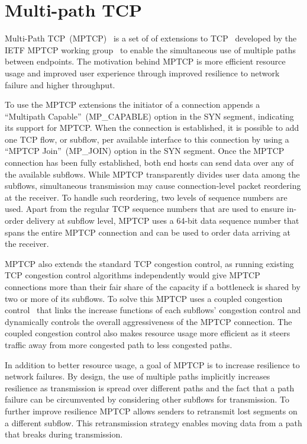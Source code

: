 \section{Multi-path TCP}
\label{sec:transports}
Multi-Path TCP~(MPTCP)~\cite{BPB11,RFC6824} is a set of of extensions to
TCP~\cite{RFC793,RFC5681} developed by the IETF MPTCP working
group~\cite{MPTCPWG} to enable the simultaneous use of multiple paths between
endpoints. The motivation behind MPTCP is more efficient resource usage and
improved user experience through improved resilience to network failure and
higher throughput.

To use the MPTCP extensions the initiator of a connection appends a
``Multipath Capable''~(MP\_CAPABLE) option in the SYN segment, indicating its support for
MPTCP. When the connection is established, it is possible to add one
TCP flow, or subflow, per available interface to this connection by using a ``MPTCP Join''~(MP\_JOIN)
option in the SYN segment. Once the MPTCP connection has been fully established, both end hosts can
send data over any of the available subflows. While MPTCP transparently
divides user data among the subflows, simultaneous transmission may cause
connection-level packet reordering at the receiver. To handle such reordering,
two levels of sequence numbers are used. Apart from the regular TCP sequence
numbers that are used to ensure in-order delivery at subflow level, MPTCP uses a
64-bit data sequence number that spans the entire MPTCP connection and can be
used to order data arriving at the receiver.

MPTCP also extends the standard TCP congestion control, as running existing TCP
congestion control algorithms independently would give MPTCP connections more
than their fair share of the capacity if a bottleneck is shared by two or more of its
subflows. To solve this MPTCP uses a coupled congestion control~\cite{rfc6356}
that links the increase functions of each subflows' congestion control and
dynamically controls the overall aggressiveness of the MPTCP connection. The
coupled congestion control also makes resource usage more efficient as it steers
traffic away from more congested path to less congested paths.

In addition to better resource usage, a goal of MPTCP is to increase
resilience to network failures. By design, the use of multiple paths implicitly
increases resilience as transmission is spread over different paths and the fact
that a path failure can be circumvented by considering other subflows for
transmission. To further improve resilience MPTCP allows senders to retransmit
lost segments on a different subflow. This retransmission strategy enables
moving data from a path that breaks during transmission.


